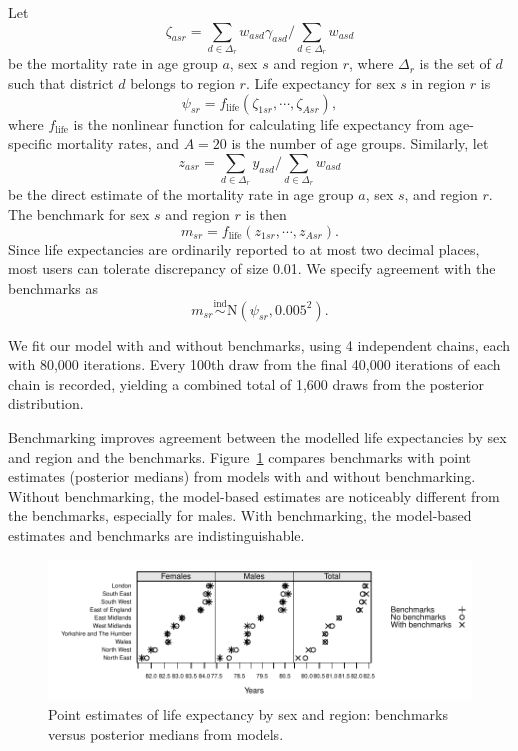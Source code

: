 \documentclass[12pt]{article}
\newcommand{\ind}{\stackrel{\text{ind}}{\sim}}
\begin{document}
Let
\begin{equation}
  \zeta_{asr} = \sum_{d \in \Delta_r} w_{asd} \gamma_{asd} / \sum_{d \in \Delta_r} w_{asd} \label{eq:aggregate_mort_rates}
\end{equation}
be the mortality rate in age group $a$, sex $s$ and region $r$, where $\Delta_r$ is the set of $d$ such that district $d$ belongs to region $r$.  Life expectancy for sex $s$ in region $r$ is
\begin{equation}
  \psi_{sr} = f_{\text{life}}(\zeta_{1sr}, \cdots, \zeta_{Asr}), \label{eq:calc_life_exp}
\end{equation}
where $f_{\text{life}}$ is the nonlinear function for calculating life expectancy from age-specific mortality rates, and $A=20$ is the number of age groups.  Similarly, let
\begin{equation}
  z_{asr} = \sum_{d \in \Delta_r} y_{asd} / \sum_{d \in \Delta_r} w_{asd}
\end{equation}
be the direct estimate of the mortality rate in age group $a$, sex $s$, and region $r$.  The benchmark for sex $s$ and region $r$ is then
\begin{equation}
  m_{sr} = f_{\text{life}}(z_{1sr}, \cdots, z_{Asr}). \label{eq:calc_life_exp}
\end{equation}
Since life expectancies are ordinarily reported to at most two decimal places, most users can tolerate discrepancy of size 0.01.
We specify agreement with the benchmarks as
\begin{equation}
  m_{sr} \ind \text{N}(\psi_{sr}, 0.005^2).
\end{equation}

We fit our model with and without benchmarks, using 4 independent chains, each with 80,000 iterations.  Every 100th draw from the final 40,000 iterations of each chain is recorded, yielding a combined total of 1,600 draws from the posterior distribution.

Benchmarking improves agreement between the modelled life expectancies by sex and region and the benchmarks.  Figure~\ref{fig:mortality_life_exp_regions} compares benchmarks with point estimates (posterior medians) from models with and without benchmarking.  Without benchmarking, the model-based estimates are noticeably different from the benchmarks, especially for males.  With benchmarking, the model-based estimates and benchmarks are indistinguishable.

\begin{figure}
  \center
    \includegraphics{out/mortality/mortality_life_exp_regions}
  \caption{\small Point estimates of life expectancy by sex and region: benchmarks versus posterior medians from models.}
  \label{fig:mortality_life_exp_regions}
\end{figure}
\end{document}
